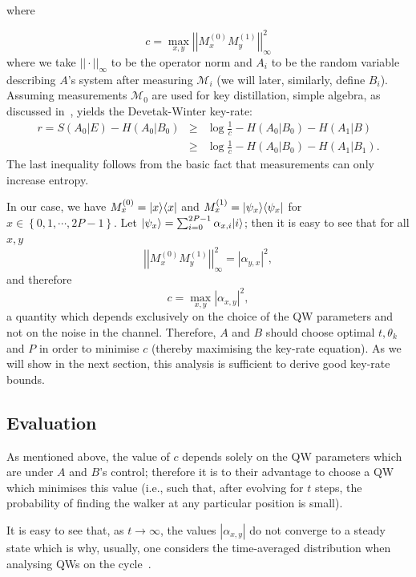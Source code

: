 where

\begin{equation}
c = \max_{x,y}\left|\left| M_x^{(0)}M_y^{(1)} \right|\right|_\infty^2
\end{equation}
where we take $||\cdot||_\infty$ to be the operator norm and $A_i$ to be the random variable describing $A$'s system after measuring $\mathcal{M}_i$ (we will later, similarly, define $B_i$). Assuming measurements $\mathcal{M}_0$ are used for key distillation, simple algebra, as discussed in~\cite{ber:chr:col:ren:ren:10}, yields the Devetak-Winter key-rate:
\begin{eqnarray*}
r = S(A_0|E) - H(A_0|B_0)& \ge &\log\frac{1}{c} - H(A_0|B_0) - H(A_1|B)\\[2mm]
&\ge & \log\frac{1}{c} - H(A_0|B_0) - H(A_1|B_1).
\end{eqnarray*}
The last inequality follows from the basic fact that measurements can only increase entropy.

In our case, we have $M_x^{(0)} = | x \rangle\langle x |$ and $M_x^{(1)} = | \psi_x \rangle\langle \psi_x |$ for $x \in \left\{0, 1, \cdots, 2P-1\right\}$.  Let $| \psi_x \rangle = \sum_{i=0}^{2P-1}\alpha_{x,i}| i \rangle$; then it is easy to see that for all $x,y$
\[
\left|\left|M_x^{(0)}M_y^{(1)}\right|\right|_\infty^2 = |\alpha_{y,x}|^2,
\]
and therefore
\begin{equation}\label{eq:prot1:cval}
c = \max_{x,y}|\alpha_{x,y}|^2,
\end{equation}
a quantity which depends exclusively on the choice of the QW parameters and not on the noise in the channel. 
Therefore, $A$ and $B$ should choose optimal $t, \theta_k$ and $P$ in order to minimise $c$ (thereby maximising the key-rate equation).
As we will show in the next section, this analysis is sufficient to derive good key-rate bounds.

\subsection{Evaluation}
As mentioned above, the value of $c$ depends solely on the QW parameters which are under $A$ and $B$'s control; therefore it is to their advantage to choose a QW which minimises this value (i.e., such that, after evolving for $t$ steps, the probability of finding the walker at any particular position is small). 

 It is easy to see that, as $t \rightarrow \infty$, the values $|\alpha_{x,y}|$ do not converge to a steady state which is why, usually, one considers the time-averaged distribution when analysing QWs on the cycle~\cite{aha:amb:kem:vaz:01,kem:03}. 

